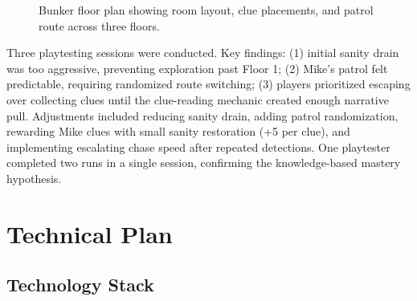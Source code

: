 \documentclass[12pt, letterpaper]{article}
\begin{document}
\begin{figure}[h]
\caption{Bunker floor plan showing room layout, clue placements, and patrol route across three floors.}
\end{figure}

Three playtesting sessions were conducted. Key findings: (1) initial sanity drain was too aggressive, preventing exploration past Floor 1; (2) Mike's patrol felt predictable, requiring randomized route switching; (3) players prioritized escaping over collecting clues until the clue-reading mechanic created enough narrative pull. Adjustments included reducing sanity drain, adding patrol randomization, rewarding Mike clues with small sanity restoration (+5 per clue), and implementing escalating chase speed after repeated detections. One playtester completed two runs in a single session, confirming the knowledge-based mastery hypothesis.

\section{Technical Plan}

\subsection{Technology Stack}
\end{document}
